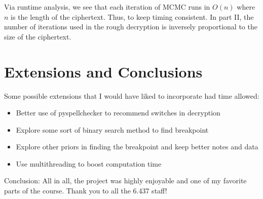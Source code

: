 \documentclass{article}
\theoremstyle{definition}
\theoremstyle{remark}
\begin{document}
Via runtime analysis, we see that each iteration of MCMC runs in $O(n)$ where $n$ is the length of the ciphertext. Thus, to keep timing consistent. In part II, the number of iterations used in the rough decryption is inversely proportional to the size of the ciphertext.

\section{Extensions and Conclusions}
Some possible extensions that I would have liked to incorporate had time allowed:

\begin{itemize}
	\item Better use of pyspellchecker to recommend switches in decryption
	\item Explore some sort of binary search method to find breakpoint
	\item Explore other priors in finding the breakpoint and keep better notes and data
	\item Use multithreading to boost computation time
\end{itemize}

Conclusion: All in all, the project was highly enjoyable and one of my favorite parts of the course. Thank you to all the 6.437 staff!
\end{document}
